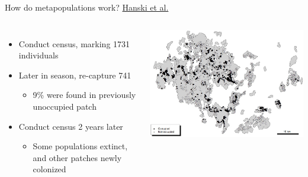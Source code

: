 \begin{frame}[t]
    \begin{adjustwidth}{-2em}{-1.5em}

    \vspace{-3mm}
    How do metapopulations work?
    \href{http://www.helsinki.fi/science/metapop/Field_sites/Aland.html}{Hanski
        et al.}

    \vspace{-2mm}
    \begin{columns}


    \begin{itemize}
            \small
        \item<1-> Conduct census, marking 1731 individuals
        \item<2-> Later in season, re-capture 741
            \begin{itemize}
                \item 9\% were found in previously unoccupied patch
            \end{itemize}
        \item<3-> Conduct census 2 years later
            \begin{itemize}
                \item Some populations extinct, and other patches newly
                    colonized
            \end{itemize}
    \end{itemize}


    \includegraphics[width=1.0\columnwidth]{../images/fritillaries-metapopulation.png}


\end{columns}
\end{adjustwidth}
\end{frame}
